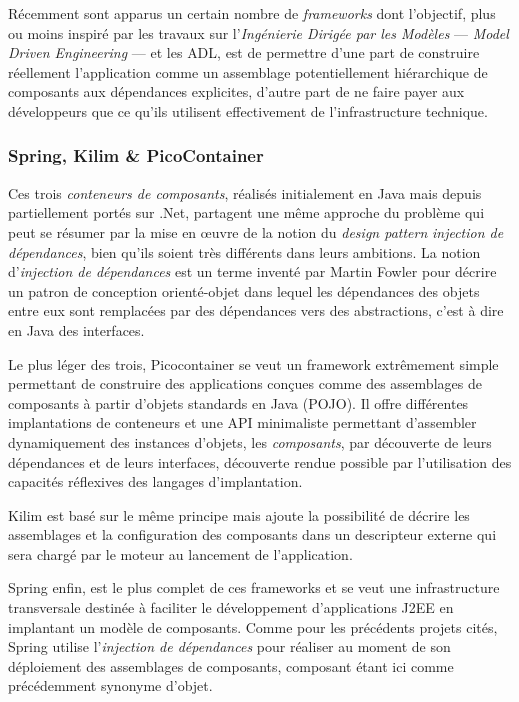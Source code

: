 R\'ecemment sont apparus un certain nombre de \emph{frameworks} 
dont l'objectif, plus ou moins inspir\'e par les travaux sur
l'\emph{Ing\'enierie Dirig\'ee par les Mod\`eles} ---
\emph{Model Driven Engineering} --- et les \textsf{ADL}, est de permettre
d'une part de construire r\'eellement l'application comme un
assemblage potentiellement hi\'erarchique de composants aux
d\'ependances explicites, d'autre part de ne faire payer aux
d\'eveloppeurs que ce qu'ils utilisent effectivement de
l'infrastructure technique. 

\subsubsection{Spring, Kilim \& PicoContainer}

Ces trois \emph{conteneurs de composants}, r\'ealis\'es initialement en
\textsf{Java} mais depuis partiellement port\'es sur \textsf{.Net}, partagent une m\^eme approche du probl\`eme qui peut
se r\'esumer par la mise en \oe uvre de la notion du \emph{design
  pattern} \og \emph{injection
  de d\'ependances}\fg , bien qu'ils soient tr\`es diff\'erents dans leurs
ambitions. La notion d'\emph{injection de d\'ependances} est un
terme invent\'e par Martin Fowler pour d\'ecrire un patron
de conception orient\'e-objet dans lequel les d\'ependances des
objets entre eux sont remplac\'ees par des d\'ependances vers des
abstractions, c'est \`a dire en \textsf{Java} des interfaces.


 Le plus l\'eger des trois, \textsf{Picocontainer} se veut
un framework extr\^emement simple permettant de 
construire des applications con\c{c}ues comme des assemblages de
composants \`a partir d'objets standards en \textsf{Java}
(POJO). Il offre diff\'erentes implantations de conteneurs et une API
minimaliste permettant d'assembler dynamiquement des instances
d'objets, les \emph{composants}, par d\'ecouverte de leurs
d\'ependances et de leurs interfaces, d\'ecouverte rendue possible
par l'utilisation des capacit\'es r\'eflexives des langages
d'implantation.

\textsf{Kilim} est bas\'e sur le m\^eme principe mais ajoute la
possibilit\'e de d\'ecrire les assemblages et la configuration des
composants dans un descripteur externe qui sera charg\'e par le
moteur au lancement  de l'application.

\textsf{Spring} enfin, est le plus complet  de ces frameworks et se
veut une infrastructure transversale destin\'ee \`a faciliter le
d\'eveloppement d'applications \textsf{J2EE} en implantant un mod\`ele de
composants. Comme pour les pr\'ec\'edents projets
cit\'es, Spring utilise l'\emph{injection de d\'ependances} pour
r\'ealiser au moment de son d\'eploiement des assemblages de
composants, composant \'etant ici comme pr\'ec\'edemment synonyme
d'objet.

